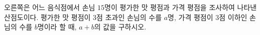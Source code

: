 \noindent\begin{minipage}[t]{0.58\linewidth}\vspace{0pt}\raggedright 오른쪽은 어느 음식점에서 손님 $15$명이 평가한 맛 평점과 가격 평점을 조사하여 나타낸 산점도이다. 평가한 맛 평점이 $3$점 초과인 손님의 수를 $a$명, 가격 평점이 $3$점 이하인 손님의 수를 $b$명이라 할 때, $a+b$의 값을 구하시오.\end{minipage}\hfill\begin{minipage}[t]{0.4\linewidth}\vspace{0pt}\centering \resizebox{\ifdim\width>\linewidth\linewidth\else\width\fi}{!}{}\end{minipage}\par
